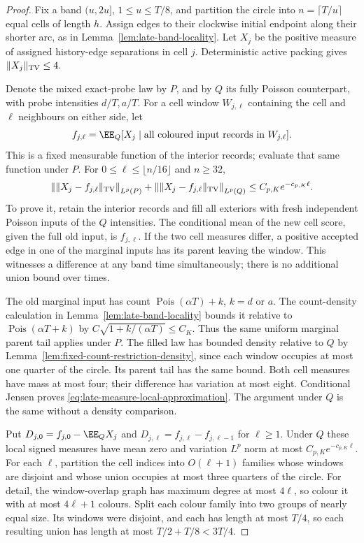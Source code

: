 \documentclass[11pt,letterpaper]{article}
\begin{document}
\begin{proof}
Fix a band $(u,2u]$, $1\le u\le T/8$, and partition the
circle into $n=\lceil T/u\rceil$ equal cells of length $h$.
Assign edges to their clockwise initial endpoint along their
shorter arc, as in Lemma~\ref{lem:late-band-locality}.
Let $X_j$ be the positive measure of assigned history-edge
separations in cell $j$. Deterministic active packing gives
$\|X_j\|_{\rm TV}\le4$.

Denote the mixed exact-probe law by $P$, and by $Q$ its
fully Poisson counterpart, with probe intensities $d/T,a/T$.
For a cell window $W_{j,\ell}$ containing the cell and
$\ell$ neighbours on either side, let
\[
 f_{j,\ell}=\EE_Q[X_j\mid
                   \hbox{all coloured input records in }W_{j,\ell}].
\]
This is a fixed measurable function of the interior records;
evaluate that same function under $P$.
For $0\le\ell\le\lfloor n/16\rfloor$ and $n\ge32$,
\begin{equation}\label{eq:late-measure-local-approximation}
 \left\|\|X_j-f_{j,\ell}\|_{\rm TV}\right\|_{L^p(P)}
       +\left\|\|X_j-f_{j,\ell}\|_{\rm TV}\right\|_{L^p(Q)}
                       \le C_{p,K}e^{-c_{p,K}\ell}.
\end{equation}
To prove it, retain the interior records and fill all exteriors
with fresh independent Poisson inputs of the $Q$ intensities.
The conditional mean of the new cell score, given the full
old input, is $f_{j,\ell}$.
If the two cell measures differ, a positive accepted edge in
one of the marginal inputs has its parent leaving the window.
This witnesses a difference at any band time simultaneously;
there is no additional union bound over times.

The old marginal input has count
$\operatorname{Pois}(\alpha T)+k$, $k=d$ or $a$.
The count-density calculation in
Lemma~\ref{lem:late-band-locality} bounds it relative to
$\operatorname{Pois}(\alpha T+k)$ by
$C\sqrt{1+k/(\alpha T)}\le C_K$.
Thus the same uniform marginal parent tail applies under $P$.
The filled law has bounded density relative to $Q$ by
Lemma~\ref{lem:fixed-count-restriction-density}, since each
window occupies at most one quarter of the circle.
Its parent tail has the same bound.
Both cell measures have mass at most four; their difference
has variation at most eight. Conditional Jensen proves
\eqref{eq:late-measure-local-approximation}.
The argument under $Q$ is the same without a density comparison.

Put $D_{j,0}=f_{j,0}-\EE_QX_j$ and
$D_{j,\ell}=f_{j,\ell}-f_{j,\ell-1}$ for $\ell\ge1$.
Under $Q$ these local signed measures have mean zero and
variation $L^p$ norm at most $C_{p,K}e^{-c_{p,K}\ell}$.
For each $\ell$, partition the cell indices into
$O(\ell+1)$ families whose windows are disjoint and whose
union occupies at most three quarters of the circle.
For detail, the window-overlap graph has maximum degree at
most $4\ell$, so colour it with at most $4\ell+1$ colours.
Split each colour family into two groups of nearly equal size.
Its windows were disjoint, and each has length at most $T/4$,
so each resulting union has length at most
$T/2+T/8<3T/4$.


\end{proof}
\end{document}
